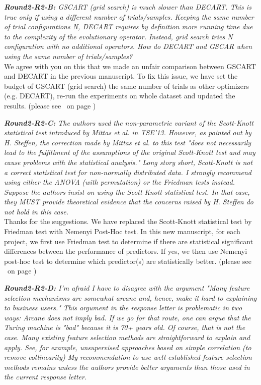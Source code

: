 \documentclass[smallextended]{svjour3}
\newcommand{\citeresp}[1]{%
{(please see }\fcolorbox{black}{black!15}{%
\bf\scriptsize R{#1}}~{{on page \pageref{resp:#1})}}}%
\newcommand{\review}[1]{{\textit{#1}}~\\}
\newcommand{\BLUE}{\color{blue}}
\newcommand{\BLACK}{\color{black}}
\begin{document}
\review{\textbf{Round2-R2-B:} GSCART (grid search) is much slower than DECART. This is true only if using a different number of trials/samples. Keeping the same number of trial configurations N, DECART requires by definition more running time due to the complexity of the evolutionary operator. Instead, grid search tries N configuration with no additional operators. How do DECART and GSCAR when using the same number of trials/samples?
}


\BLUE
We agree with you on this that we made an unfair comparison between GSCART and DECART in the previous manuscript. To fix this issue, we have set the budget of GSCART (grid search) the same number of trials as other optimizers (e.g. DECART), re-run the experiments on whole dataset and updated the results. \citeresp{2B}
\BLACK
\bigskip

\review{\textbf{Round2-R2-C:} The authors used the non-parametric variant of the Scott-Knott statistical test introduced by Mittas et al. in TSE'13. However, as pointed out by H. Steffen, the correction made by Mittas et al. to this test "does not necessarily lead to the fulfillment of the assumptions of the original Scott-Knott test and may cause problems with the statistical analysis." Long story short, Scott-Knott is not a correct statistical test for non-normally distributed data. I strongly recommend using either the ANOVA (with permutation) or the Friedman tests instead. Suppose the authors insist on using the Scott-Knott statistical test. In that case, they MUST provide theoretical evidence that the concerns raised by H. Steffen do not hold in this case.
}


\BLUE
Thanks for the suggestions. We have replaced the Scott-Knott statistical test by Friedman test with Nemenyi Post-Hoc test. In this new manuscript, for each project, we first use Friedman test to determine if there are statistical significant differences between the performance of predictors. If yes, we then use Nemenyi post-hoc test to determine which predictor(s) are statistically better. \citeresp{2C}
\BLACK
\bigskip


\review{\textbf{Round2-R2-D:} I'm afraid I have to disagree with the argument "Many feature selection mechanisms are somewhat arcane and, hence, make it hard to explaining to business users." This argument in the response letter is problematic in two ways:
Arcane does not imply bad. If we go for that route, one can argue that the Turing machine is "bad" because it is 70+ years old. Of course, that is not the case.
Many existing feature selection methods are straightforward to explain and apply. See, for example, unsupervised approaches based on simple correlation (to remove collinearity)
My recommendation to use well-established feature selection methods remains unless the authors provide better arguments than those used in the current response letter.
}
\end{document}
